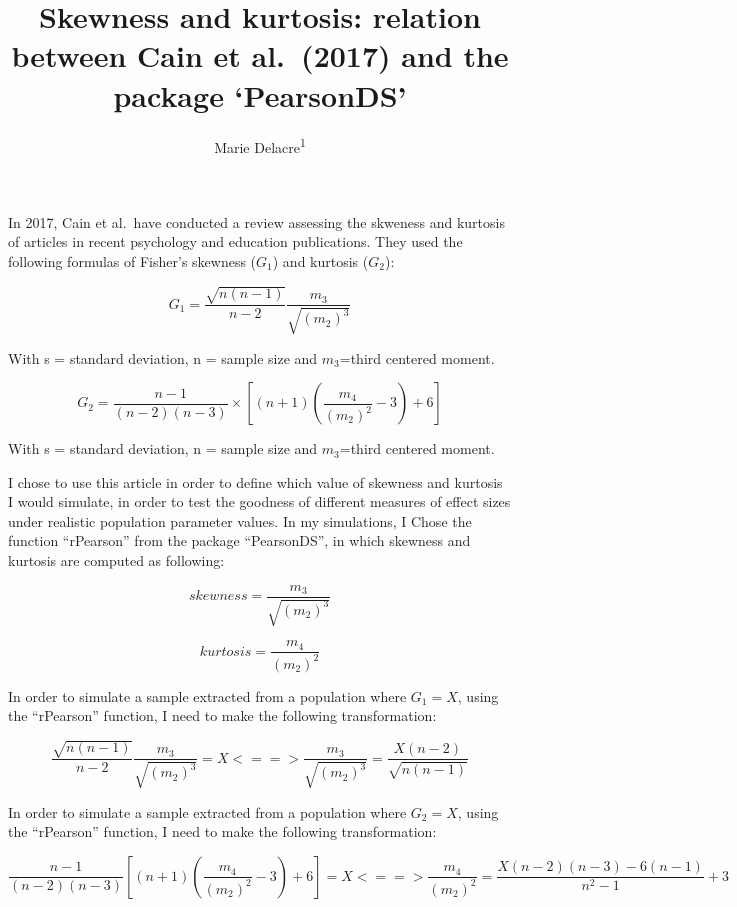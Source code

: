 \documentclass[man]{apa6}
\title{Skewness and kurtosis: relation between Cain et al.~(2017) and the package `PearsonDS'}
\author{Marie Delacre\textsuperscript{1}}
\date{}
\affiliation{
\vspace{0.5cm}
\textsuperscript{1} Service of Analysis of the Data, Université Libre de Bruxelles, Belgium}
\begin{document}
\maketitle

In 2017, Cain et al.~have conducted a review assessing the skweness and kurtosis of articles in recent psychology and education publications. They used the following formulas of Fisher's skewness (\(G_{1}\)) and kurtosis (\(G_{2}\)):

\begin{equation} 
G_{1}=\frac{\sqrt{n(n-1)}}{n-2} \frac{m_{3}}{\sqrt{(m_{2})^3}}
\label{eq:skew}
\end{equation}

With s = standard deviation, n = sample size and \(m_{3}\)=third centered moment.

\begin{equation} 
G_{2}=\frac{n-1}{(n-2)(n-3)}\times [(n+1)(\frac{m_{4}}{(m_{2})^2}-3)+6]
\label{eq:kurt}
\end{equation}

With s = standard deviation, n = sample size and \(m_{3}\)=third centered moment.

I chose to use this article in order to define which value of skewness and kurtosis I would simulate, in order to test the goodness of different measures of effect sizes under realistic population parameter values. In my simulations, I Chose the function \enquote{rPearson} from the package \enquote{PearsonDS}, in which skewness and kurtosis are computed as following:

\begin{equation} 
skewness=\frac{m_{3}}{\sqrt{(m_{2})^3}}
\label{eq:skewnessrPearson}
\end{equation}

\begin{equation} 
kurtosis=\frac{m_{4}}{(m_{2})^2}
\label{eq:kurtosisrPearson}
\end{equation}

In order to simulate a sample extracted from a population where \(G_{1}= X\), using the \enquote{rPearson} function, I need to make the following transformation:

\begin{equation} 
\frac{\sqrt{n(n-1)}}{n-2} \frac{m_{3}}{\sqrt{(m_{2})^3}} = X
<==> \frac{m_{3}}{\sqrt{(m_{2})^3}} = \frac{X(n-2)}{\sqrt{n(n-1)}}
\label{eq:skewnesstransformation}
\end{equation}

In order to simulate a sample extracted from a population where \(G_{2}= X\), using the \enquote{rPearson} function, I need to make the following transformation:

\begin{equation} 
\frac{n-1}{(n-2)(n-3)} [(n+1)(\frac{m_{4}}{(m_{2})^2}-3)+6] = X  
<==> \frac{m_{4}}{(m_{2})^2}=\frac{X(n-2)(n-3)-6(n-1)}{n^2-1}+3
\label{eq:kurtosistransformation}
\end{equation}
\end{document}
